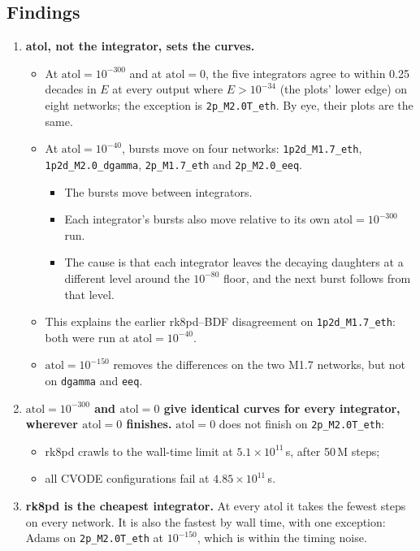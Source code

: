 \documentclass[10pt,a4paper]{article}
\newcommand{\atol}{\mathrm{atol}}
\begin{document}
\subsection{Findings}
\begin{enumerate}
    \item \textbf{atol, not the integrator, sets the curves.}
        \begin{itemize}
            \item At $\atol=10^{-300}$ and at $\atol=0$, the five integrators agree to within 0.25 decades in $E$ at every output where $E>10^{-34}$ (the plots' lower edge) on eight networks; the exception is \texttt{2p\_M2.0T\_eth}. By eye, their plots are the same.
            \item At $\atol=10^{-40}$, bursts move on four networks: \texttt{1p2d\_M1.7\_eth}, \texttt{1p2d\_M2.0\_dgamma}, \texttt{2p\_M1.7\_eth} and \texttt{2p\_M2.0\_eeq}.
                \begin{itemize}
                    \item The bursts move between integrators.
                    \item Each integrator's bursts also move relative to its own $\atol=10^{-300}$ run.
                    \item The cause is that each integrator leaves the decaying daughters at a different level around the $10^{-80}$ floor, and the next burst follows from that level.
                \end{itemize}
            \item This explains the earlier rk8pd--BDF disagreement on \texttt{1p2d\_M1.7\_eth}: both were run at $\atol=10^{-40}$.
            \item $\atol=10^{-150}$ removes the differences on the two M1.7 networks, but not on \texttt{dgamma} and \texttt{eeq}.
        \end{itemize}
    \item \textbf{$\atol=10^{-300}$ and $\atol=0$ give identical curves for every integrator, wherever $\atol=0$ finishes.} $\atol=0$ does not finish on \texttt{2p\_M2.0T\_eth}:
        \begin{itemize}
            \item rk8pd crawls to the wall-time limit at $5.1\times10^{11}$\,s, after 50\,M steps;
            \item all CVODE configurations fail at $4.85\times10^{11}$\,s.
        \end{itemize}
    \item \textbf{rk8pd is the cheapest integrator.} At every $\atol$ it takes the fewest steps on every network. It is also the fastest by wall time, with one exception: Adams on \texttt{2p\_M2.0T\_eth} at $10^{-150}$, which is within the timing noise.

\end{enumerate}
\end{document}
